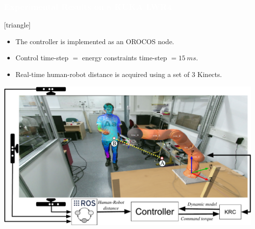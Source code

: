 %
%


\begin{frame}
\frametitle{{\textcolor{white}{\hspace{0.2cm}Experimental Results on a KUKA LWR4}}}
[triangle] 
\begin{itemize}
\item The controller is implemented as an OROCOS node.
\setlength\itemsep{-1mm}
\item Control time-step $=$ energy constraints time-step {\color{red}$=15~ms$}.
\setlength\itemsep{-1mm}
\item Real-time human-robot distance is acquired using a set of 3 Kinects.
\end{itemize}

\begin{center}
\includegraphics[width=1.0\textwidth]{figures/HR_INT_HW_STRUCT.pdf}
\end{center}

\end{frame}

